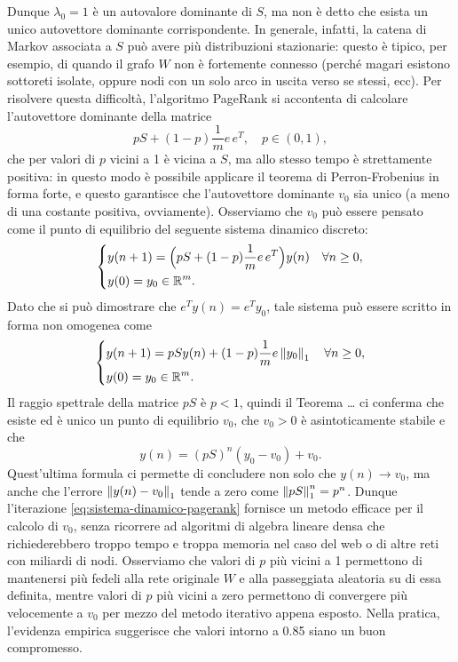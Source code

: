 \noindent Dunque $\lambda_0 = 1$ è un autovalore dominante di $S$, ma non è
detto che esista un unico autovettore dominante corrispondente.
In generale, infatti, la catena di Markov associata a $S$ può avere
più distribuzioni stazionarie: questo è tipico, per esempio, di quando il grafo
$W$ non è fortemente connesso (perché magari esistono sottoreti isolate,
oppure nodi con un solo arco in uscita verso se stessi, ecc).
Per risolvere questa difficoltà, l'algoritmo PageRank si accontenta
di calcolare l'autovettore dominante della matrice
\[
pS + (1-p) \frac{1}{m} e \, e^T, \quad p \in (0,1),
\]
che per valori di $p$ vicini a 1 è vicina a $S$, ma allo stesso tempo
è strettamente positiva: in questo modo è possibile applicare il teorema
di Perron-Frobenius in forma forte, e questo garantisce che l'autovettore
dominante $v_0$ sia unico (a meno di una costante positiva, ovviamente).
Osserviamo che $v_0$ può essere pensato come il punto di equilibrio
del seguente sistema dinamico discreto:
\[
\left\{
\begin{aligned}
& y(n+1) = \Bigl( pS + (1-p) \frac{1}{m} e \, e^T \Bigr) y(n) \quad \forall n \geq 0, \\
& y(0) = y_0 \in \mathbb{R}^m.
\end{aligned}
\right.
\]
Dato che si può dimostrare che $e^T y(n) = e^T y_0$, tale sistema può essere scritto
in forma non omogenea come
\begin{equation} \label{eq:sistema-dinamico-pagerank}
\left\{
\begin{aligned}
& y(n+1) = p S y(n) + (1-p) \frac{1}{m} e \left\lVert y_0\right\rVert_1 \quad \forall n \geq 0, \\
& y(0) = y_0 \in \mathbb{R}^m.
\end{aligned}
\right.
\end{equation}
Il raggio spettrale della matrice $pS$ è $p < 1$, quindi il Teorema \dots
ci conferma che esiste ed è unico un punto di equilibrio $v_0$,
che $v_0 > 0$ è asintoticamente stabile e che
\[
y(n) = (pS)^n (y_0 - v_0) + v_0.
\]
Quest'ultima formula ci permette di concludere non solo che $y(n) \to v_0$,
ma anche che l'errore $\left\lVert y(n)-v_0\right\rVert_1$ tende a zero come
$\left\lVert pS\right\rVert_1^n = p^n$.
Dunque l'iterazione \ref{eq:sistema-dinamico-pagerank} fornisce un metodo
efficace per il calcolo di $v_0$, senza ricorrere ad algoritmi di algebra
lineare densa che richiederebbero troppo tempo e troppa memoria nel caso
del web o di altre reti con miliardi di nodi. Osserviamo che valori
di $p$ più vicini a 1 permettono di mantenersi più fedeli alla rete originale
$W$ e alla passeggiata aleatoria su di essa definita, mentre valori di $p$
più vicini a zero permettono di convergere più velocemente a $v_0$
per mezzo del metodo iterativo appena esposto. Nella pratica, l'evidenza empirica
suggerisce che valori intorno a 0.85 siano un buon compromesso.

